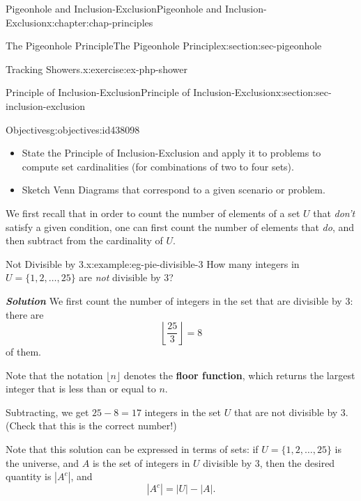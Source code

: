 \documentclass[oneside,10pt,]{book}
\newcommand{\alert}[1]{\textbf{\textit{#1}}}
\newcommand{\terminology}[1]{\textbf{#1}}
\numberwithin{equation}{section}
\begin{document}
\begin{chapterptx}{Pigeonhole and Inclusion-Exclusion}{}{Pigeonhole and Inclusion-Exclusion}{}{}{x:chapter:chap-principles}
\begin{sectionptx}{The Pigeonhole Principle}{}{The Pigeonhole Principle}{}{}{x:section:sec-pigeonhole}
\begin{inlineexercise}{Tracking Showers.}{x:exercise:ex-php-shower}
\begin{enumerate}[label=(\alph*)]
\end{enumerate}
%
\end{inlineexercise}
\end{sectionptx}
%
%
\typeout{************************************************}
\typeout{************************************************}
%
\begin{sectionptx}{Principle of Inclusion-Exclusion}{}{Principle of Inclusion-Exclusion}{}{}{x:section:sec-inclusion-exclusion}
\begin{objectives}{Objectives}{g:objectives:id438098}
%
\begin{itemize}[label=\textbullet]
\item{}State the Principle of Inclusion-Exclusion and apply it to problems to compute set cardinalities (for combinations of two to four sets).%
\item{}Sketch Venn Diagrams that correspond to a given scenario or problem.%
\end{itemize}
\end{objectives}
We first recall that in order to count the number of elements of a set \(U\) that \emph{don't} satisfy a given condition, one can first count the number of elements that \emph{do}, and then subtract from the cardinality of \(U\).%
\begin{example}{Not Divisible by 3.}{x:example:eg-pie-divisible-3}%
How many integers in \(U = \{1,2,\ldots,25\}\) are \emph{not} divisible by 3?%
\par
\alert{Solution} \label{g:notation:id438305} We first count the number of integers in the set that are divisible by 3: there are%
\begin{equation*}
\left\lfloor \frac{25}{3}\right\rfloor = 8
\end{equation*}
of them.%
\par
Note that the notation \(\lfloor n \rfloor\) denotes the \terminology{floor function}, which returns the largest integer that is less than or equal to \(n\).%
\par
Subtracting, we get \(25 - 8 = 17\) integers in the set \(U\) that are not divisible by 3. (Check that this is the correct number!)%
\end{example}
Note that this solution can be expressed in terms of sets: if \(U = \{1,2,\ldots,25\}\) is the universe, and \(A\) is the set of integers in \(U\) divisible by 3, then the desired quantity is \(|A^c|\), and%
\begin{equation*}
|A^c| = |U| - |A|\text{.}
\end{equation*}

\end{sectionptx}
\end{chapterptx}
\end{document}
